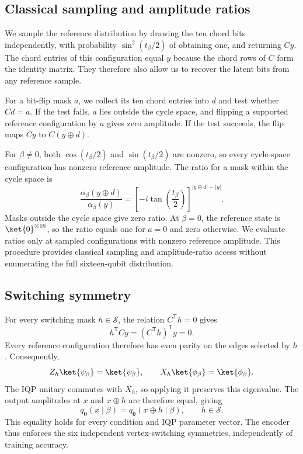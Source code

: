 \subsection{Classical sampling and amplitude ratios}

We sample the reference distribution by drawing the ten chord bits independently, with probability $\sin^2(t_\beta/2)$ of obtaining one, and returning $Cy$. The chord entries of this configuration equal $y$ because the chord rows of $C$ form the identity matrix. They therefore also allow us to recover the latent bits from any reference sample.

For a bit-flip mask $a$, we collect its ten chord entries into $d$ and test whether $Cd=a$. If the test fails, $a$ lies outside the cycle space, and flipping a supported reference configuration by $a$ gives zero amplitude. If the test succeeds, the flip maps $Cy$ to $C(y\oplus d)$.

For $\beta\neq0$, both $\cos(t_\beta/2)$ and $\sin(t_\beta/2)$ are nonzero, so every cycle-space configuration has nonzero reference amplitude. The ratio for a mask within the cycle space is
\begin{equation}
 \frac{\alpha_\beta(y\oplus d)}{\alpha_\beta(y)}
 =
 \left[-i\tan\!\left(\frac{t_\beta}{2}\right)\right]^{|y\oplus d|-|y|}.
\end{equation}
Masks outside the cycle space give zero ratio. At $\beta=0$, the reference state is $\ket{0}^{\otimes16}$, so the ratio equals one for $a=0$ and zero otherwise. We evaluate ratios only at sampled configurations with nonzero reference amplitude. This procedure provides classical sampling and amplitude-ratio access without enumerating the full sixteen-qubit distribution.

\subsection{Switching symmetry}

For every switching mask $h\in\mathcal S$, the relation $C^{\mathsf T}h=0$ gives
\begin{equation}
 h^{\mathsf T}Cy=(C^{\mathsf T}h)^{\mathsf T}y=0.
\end{equation}
Every reference configuration therefore has even parity on the edges selected by $h$. Consequently,
\begin{equation}
 Z_h\ket{\psi_\beta}=\ket{\psi_\beta},
 \qquad
 X_h\ket{\phi_\beta}=\ket{\phi_\beta}.
\end{equation}
The IQP unitary commutes with $X_h$, so applying it preserves this eigenvalue. The output amplitudes at $x$ and $x\oplus h$ are therefore equal, giving
\begin{equation}
 q_{\boldsymbol\theta}(x\mid\beta)
 =
 q_{\boldsymbol\theta}(x\oplus h\mid\beta),
 \qquad h\in\mathcal S.
\end{equation}
This equality holds for every condition and IQP parameter vector. The encoder thus enforces the six independent vertex-switching symmetries, independently of training accuracy.
